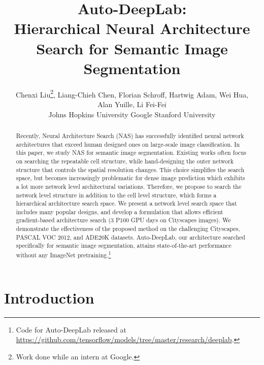 \documentclass[10pt,twocolumn,letterpaper]{article}
\begin{document}
\title{Auto-DeepLab: \\Hierarchical Neural Architecture Search for Semantic Image Segmentation}




\author{Chenxi Liu\thanks{Work done while an intern at Google.}, Liang-Chieh Chen, Florian Schroff, Hartwig Adam, Wei Hua,\\ Alan Yuille, Li Fei-Fei\\
Johns Hopkins University \quad Google \quad Stanford University\\
}

\maketitle


\begin{abstract}
Recently, Neural Architecture Search (NAS) has successfully identified neural network architectures that exceed human designed ones on large-scale image classification. In this paper, we study NAS for semantic image segmentation. Existing works often focus on searching the repeatable cell structure, while hand-designing the outer network structure that controls the spatial resolution changes. This choice simplifies the search space, but becomes increasingly problematic for dense image prediction which exhibits a lot more network level architectural variations. Therefore, we propose to search the network level structure in addition to the cell level structure, which forms a hierarchical architecture search space. We present a network level search space that includes many popular designs, and develop a formulation that allows efficient gradient-based architecture search (3 P100 GPU days on Cityscapes images). We demonstrate the effectiveness of the proposed method on the challenging Cityscapes, PASCAL VOC 2012, and ADE20K datasets. Auto-DeepLab, our architecture searched specifically for semantic image segmentation, attains state-of-the-art performance without any ImageNet pretraining.\footnote{Code for Auto-DeepLab released at \url{https://github.com/tensorflow/models/tree/master/research/deeplab}.}
\end{abstract}
 \vspace{-0.8\baselineskip}
\section{Introduction}
\vspace{-0.2\baselineskip}
\label{sec:intro}
\end{document}
